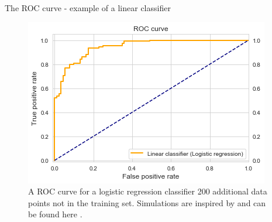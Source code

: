 \documentclass[xcolor={usenames,dvipsnames},handout]{beamer}
\begin{document}
\begin{frame}{The ROC curve - example of a linear classifier}

\begin{figure}[h]
		\center
		\includegraphics[height=0.75\textheight]{roc}
		\caption{A ROC curve for a  logistic regression classifier 200 additional data points not in the training set. Simulations are inspired by  and can be found here .}
	\end{figure}
\end{frame}
\end{document}
